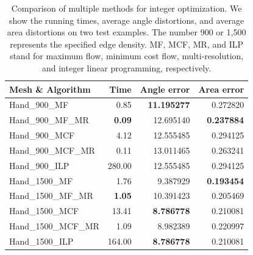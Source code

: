 \begin{table}[tbp]
\centering
\caption{Comparison of multiple methods for integer optimization. We show the running times, average angle distortions, and average area distortions on two test examples.  The number 900 or 1,500 represents the specified edge density. MF, MCF, MR, and ILP stand for maximum flow, minimum cost flow, multi-resolution, and integer linear programming, respectively.}
\label{tab:quad-methodology}
\begin{tabular}{lrrr}
\hline
Mesh \& Algorithm      & Time   & Angle error & Area error \\ \hline
Hand\_900\_MF          & 0.85  & \textbf{11.195277}   & 0.272820    \\
Hand\_900\_MF\_MR      & \textbf{0.09}  & 12.695140    & \textbf{0.237884}   \\
Hand\_900\_MCF         & 4.12  & 12.555485   & 0.294125   \\
Hand\_900\_MCF\_MR     & 0.11  & 13.011465   & 0.263241   \\
Hand\_900\_ILP         & 280.00 & 12.555485   & 0.294125   \\ \hline
Hand\_1500\_MF         & 1.76  & 9.387929    & \textbf{0.193454}   \\
Hand\_1500\_MF\_MR     & \textbf{1.05}  & 10.391423   & 0.205469   \\
Hand\_1500\_MCF        & 13.41 & \textbf{8.786778}    & 0.210081   \\
Hand\_1500\_MCF\_MR    & 1.09  & 8.982389    & 0.220997   \\
Hand\_1500\_ILP        & 164.00   & \textbf{8.786778}    & 0.210081  \\  \hline
\end{tabular}
\end{table}

